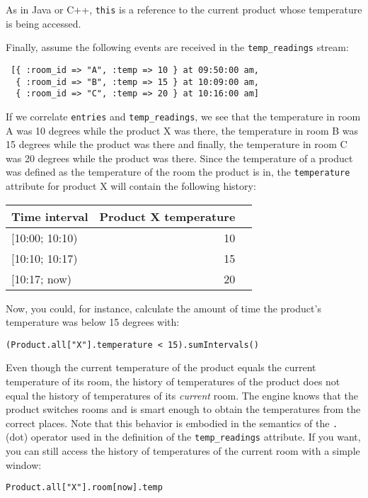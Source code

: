 \documentclass{report}
\begin{document}
As in Java or C++, \verb=this= is a reference to the current product
whose temperature is being accessed.

Finally, assume the following events are received in the
\verb=temp_readings= stream:

\begin{verbatim}
 [{ :room_id => "A", :temp => 10 } at 09:50:00 am,
  { :room_id => "B", :temp => 15 } at 10:09:00 am,
  { :room_id => "C", :temp => 20 } at 10:16:00 am]
\end{verbatim}

If we correlate \verb=entries= and \verb=temp_readings=, we see that
the temperature in room A was 10 degrees while the product X was
there, the temperature in room B was 15 degrees while the product was
there and finally, the temperature in room C was 20 degrees while the
product was there. Since the temperature of a product was defined as
the temperature of the room the product is in, the \verb=temperature=
attribute for product X will contain the following history:

\begin{tabular}{ |l|r|r| }
  \hline
 Time interval & Product X temperature \\
  \hline
  $[$10:00; 10:10) & 10 \\
  $[$10:10; 10:17) & 15 \\
  $[$10:17;   now) & 20 \\
  \hline
\end{tabular}

Now, you could, for instance, calculate the amount of time the
product's temperature was below 15 degrees with:

\begin{verbatim}
(Product.all["X"].temperature < 15).sumIntervals()
\end{verbatim}

Even though the current temperature of the product equals the current
temperature of its room, the history of temperatures of the product
does not equal the history of temperatures of its \emph{current}
room. The engine knows that the product switches rooms and is smart
enough to obtain the temperatures from the correct places. Note that
this behavior is embodied in the semantics of the \verb=.= (dot)
operator used in the definition of the \verb=temp_readings=
attribute. If you want, you can still access the history of
temperatures of the current room with a simple window:

\begin{verbatim}
Product.all["X"].room[now].temp
\end{verbatim}
\end{document}
